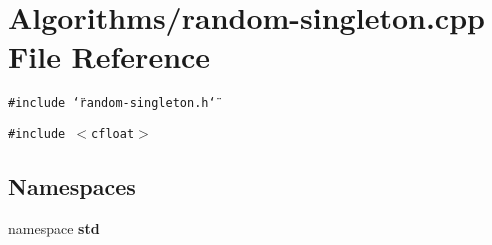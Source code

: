 \section{Algorithms/random-singleton.cpp File Reference}
\label{random-singleton_8cpp}
{\tt \#include \char`\"{}random-singleton.h\char`\"{}}\par
{\tt \#include $<$cfloat$>$}\par
\subsection*{Namespaces}
\begin{CompactItemize}
\item 
namespace {\bf std}
\end{CompactItemize}
